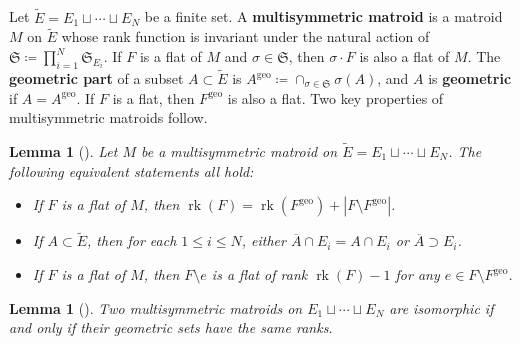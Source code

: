 \documentclass[11pt]{article}
\newtheorem{lemm}[theo]{Lemma}
\theoremstyle{definition}
\numberwithin{equation}{section}
\newcommand{\geo}{\mathrm{geo}}
\DeclareMathOperator{\rk}{rk}
\newcommand{\word}[1]{\textbf{#1}}
\begin{document}
\subsection{}
Let $\widetilde E = E_1 \sqcup \cdots \sqcup E_N$ be a finite set. A \word{multisymmetric matroid} is a matroid $M$ on $\widetilde E$ whose rank function is invariant under the natural action of $\mathfrak S \coloneqq  \prod_{i=1}^N \mathfrak S_{E_i}$.
If $F$ is a flat of $M$ and $\sigma \in \mathfrak S$, then $\sigma \cdot F$ is also a flat of $M$.
The \word{geometric part} of a subset $A \subset \widetilde E$ is $A^\geo \coloneqq  \cap_{\sigma \in \mathfrak S} \sigma(A)$, and $A$ is \word{geometric} if $A = A^\geo$.
If $F$ is a flat, then $F^\geo$ is also a flat.
Two key properties of multisymmetric matroids follow.
\begin{lemm}[{\cite[Lemma 2.8]{CHLSW22}}]\label{rankformula}\label{closure}\label{multisymmetricsubtraction}
  Let $M$ be a multisymmetric matroid on $\widetilde E = E_1 \sqcup \cdots \sqcup E_N$.
  The following equivalent statements all hold:
  \begin{itemize}
  \item If $F$ is a flat of $M$, then $\rk(F) = \rk(F^\geo) + |F \setminus F^\geo|$.
  \item If $A \subset \widetilde E$, then for each $1 \leq i \leq N$, either $\overline{A} \cap E_i = A \cap E_i$ or $\overline A \supset E_i$.
  \item If $F$ is a flat of $M$, then $F \setminus e$ is a flat of rank $\rk(F) - 1$ for any $e \in F \setminus F^\geo$.
  \end{itemize}
\end{lemm}

\begin{lemm}[{\cite[Lemma 2.9]{CHLSW22}}]\label{determinedbygeo}
  Two multisymmetric matroids on $E_1 \sqcup \cdots \sqcup E_N$ are isomorphic if and only if their geometric sets have the same ranks.
\end{lemm}
\end{document}
